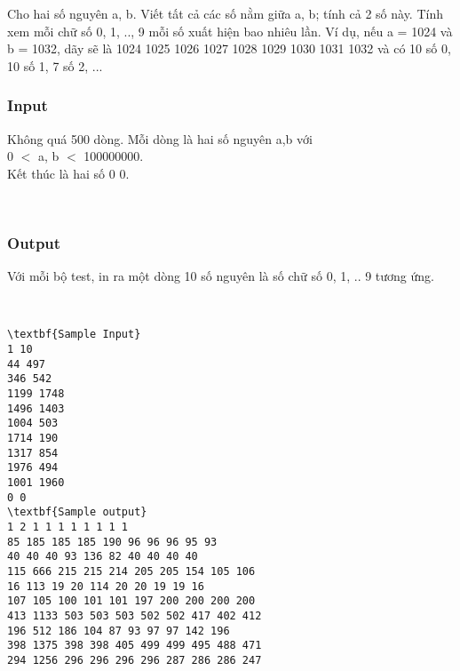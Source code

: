 

Cho hai số nguyên a, b. Viết tất cả các số nằm giữa a, b; tính cả 2 số này. Tính xem mỗi chữ số 0, 1, .., 9 mỗi số xuất hiện bao nhiêu lần. Ví dụ, nếu a = 1024 và b = 1032, dãy sẽ là 1024 1025 1026 1027 1028 1029 1030 1031 1032 và có 10 số 0, 10 số 1, 7 số 2, ...

\subsubsection{Input}

Không quá 500 dòng. Mỗi dòng là hai số nguyên a,b với
\\0 $<$ a, b $<$ 100000000.
\\Kết thúc là hai số 0 0.

 

\subsubsection{Output}

Với mỗi bộ test, in ra một dòng 10 số nguyên là số chữ số 0, 1, .. 9 tương ứng. 

 
\begin{verbatim}
\textbf{Sample Input}
1 10 
44 497 
346 542 
1199 1748 
1496 1403 
1004 503 
1714 190 
1317 854 
1976 494 
1001 1960 
0 0
\textbf{Sample output}
1 2 1 1 1 1 1 1 1 1 
85 185 185 185 190 96 96 96 95 93 
40 40 40 93 136 82 40 40 40 40 
115 666 215 215 214 205 205 154 105 106 
16 113 19 20 114 20 20 19 19 16 
107 105 100 101 101 197 200 200 200 200 
413 1133 503 503 503 502 502 417 402 412 
196 512 186 104 87 93 97 97 142 196 
398 1375 398 398 405 499 499 495 488 471 
294 1256 296 296 296 296 287 286 286 247 
\end{verbatim}